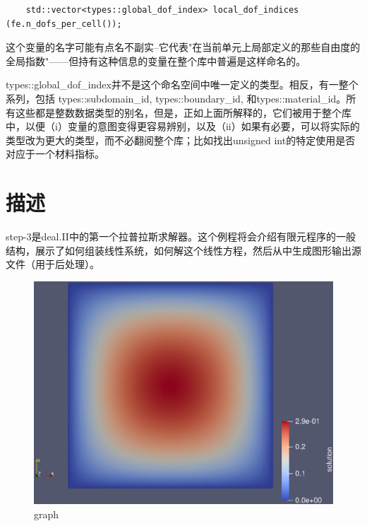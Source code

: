 \documentclass[nofonts]{ctexart} %
\begin{document}
\begin{lstlisting}
    std::vector<types::global_dof_index> local_dof_indices (fe.n_dofs_per_cell());
\end{lstlisting}
这个变量的名字可能有点名不副实--它代表"在当前单元上局部定义的那些自由度的全局指数"——但持有这种信息的变量在整个库中普遍是这样命名的。

    types::global\_dof\_index并不是这个命名空间中唯一定义的类型。相反，有一整个系列，包括 types::subdomain\_id, types::boundary\_id, 和types::material\_id。所有这些都是整数数据类型的别名，但是，正如上面所解释的，它们被用于整个库中，以便（i）变量的意图变得更容易辨别，以及（ii）如果有必要，可以将实际的类型改为更大的类型，而不必翻阅整个库；比如找出unsigned int的特定使用是否对应于一个材料指标。
\section{描述}
step-3是deal.II中的第一个拉普拉斯求解器。这个例程将会介绍有限元程序的一般结构，展示了如何组装线性系统，如何解这个线性方程，然后从中生成图形输出源文件（用于后处理）。
\begin{figure}[htbp]
      \centering
      \includegraphics[scale=0.5]{./solution.eps}
      \caption{graph}
  \end{figure}
\end{document}
